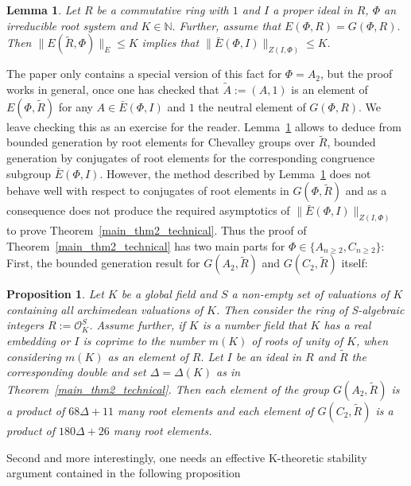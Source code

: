 \documentclass[12pt]{amsart}
\newtheorem{lemma}[theorem]{Lemma}
\newtheorem{proposition}[theorem]{Proposition}
\theoremstyle{definition}\newtheorem{definition}[theorem]{Definition}
\theoremstyle{remark}\newtheorem{remark}[theorem]{Remark}
\theoremstyle{definition}\newtheorem{case}{Case}
\begin{document}
\begin{lemma}\cite[Proof of Corollary~3.3]{gvozdevsky2023width}\label{bounded_gen_double_implies_conj_gen}
Let $R$ be a commutative ring with $1$ and $I$ a proper ideal in $R$, $\Phi$ an irreducible root system and $K\in\mathbb{N}.$ Further, assume that $E(\Phi,R)=G(\Phi,R).$ Then $\|E(\tilde{R},\Phi)\|_E\leq K$ implies that $\|\bar{E}(\Phi,I)\|_{Z(I,\Phi)}\leq K.$
\end{lemma}

The paper \cite{gvozdevsky2023width} only contains a special version of this fact for $\Phi=A_2$, but the proof works in general, once one has checked that $\tilde{A}:=(A,1)$ is an element of $E(\Phi,\tilde{R})$ for any $A\in\bar{E}(\Phi,I)$ and $1$ the neutral element of $G(\Phi,R)$. We leave checking this as an exercise for the reader. Lemma~\ref{bounded_gen_double_implies_conj_gen} allows to deduce from bounded generation by root elements for Chevalley groups over $\tilde{R}$, bounded generation by conjugates of root elements for the corresponding congruence subgroup $\bar{E}(\Phi,I).$ However, the method described by Lemma~\ref{bounded_gen_double_implies_conj_gen} does not behave well with respect to conjugates of root elements in $G(\Phi,\tilde{R})$ and as a consequence does not produce the required asymptotics of $\|\bar{E}(\Phi,I)\|_{Z(I,\Phi)}$ to prove Theorem~\ref{main_thm2_technical}. Thus the proof of Theorem~\ref{main_thm2_technical} has two main parts for $\Phi\in\{A_{n\geq 2},C_{n\geq 2}\}$: First, the bounded generation result for $G(A_2,\tilde{R})$ and $G(C_2,\tilde{R})$ itself:

\begin{proposition}\label{bounded_gen_tilde}
Let $K$ be a global field and $S$ a non-empty set of valuations of $K$ containing all archimedean valuations of $K$. Then consider the ring of S-algebraic integers $R:=\mathscr{O}_K^S$. Assume further, if $K$ is a number field that $K$ has a real embedding or $I$ is coprime to the number $m(K)$ of roots of unity of $K$, when considering $m(K)$ as an element of $R.$ Let $I$ be an ideal in $R$ and $\tilde{R}$ the corresponding double and set $\Delta=\Delta(K)$ as in Theorem~\ref{main_thm2_technical}. Then each element of the group $G(A_2,\tilde{R})$ is a product of $68\Delta+11$ many root elements and each element of $G(C_2,\tilde{R})$ is a product of $180\Delta+26$
many root elements.
\end{proposition}

Second and more interestingly, one needs an effective K-theoretic stability argument contained in the following proposition
\end{document}
